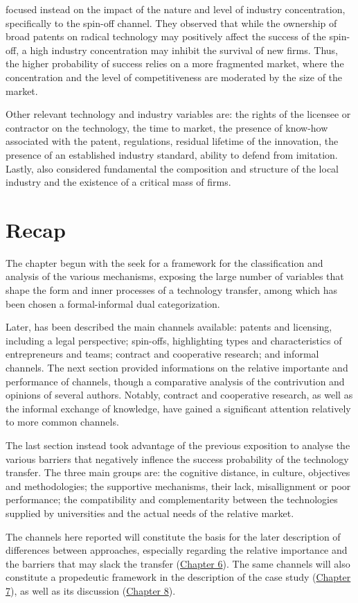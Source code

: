 \citet{Nerkar2003} focused instead on the impact of the nature and level of industry concentration, specifically to the spin-off channel. They observed that while the ownership of broad patents on radical technology may positively affect the success of the spin-off, a high industry concentration may inhibit the survival of new firms. Thus, the higher probability of success relies on a more fragmented market, where the concentration and the level of competitiveness are moderated by the size of the market. 

Other relevant technology and industry variables are: the rights of the licensee or contractor on the technology, the time to market, the presence of know-how associated with the patent, regulations, residual lifetime of the innovation, the presence of an established industry standard, ability to defend from imitation\citep{Balderi2010}. Lastly, \citet{Geuna2009} also considered fundamental the composition and structure of the local industry and the existence of a critical mass of firms.

\section{Recap}

The chapter begun with the seek for a framework for the classification and analysis of the various mechanisms, exposing the large number of variables that shape the form and inner processes of a technology transfer, among which has been chosen a formal-informal dual categorization.

Later, has been described the main channels available: patents and licensing, including a legal perspective; spin-offs, highlighting types and characteristics of entrepreneurs and teams; contract and cooperative research; and informal channels. The next section provided informations on the relative importante and performance of channels, though a comparative analysis of the contrivution and opinions of several authors. Notably, contract and cooperative research, as well as the informal exchange of knowledge, have gained a significant attention relatively to more common channels.

The last section instead took advantage of the previous exposition to analyse the various barriers that negatively inflence the success probability of the technology transfer. The three main groups are: the cognitive distance, in culture, objectives and methodologies; the supportive mechanisms, their lack, misallignment or poor performance; the compatibility and complementarity between the technologies supplied by universities and the actual needs of the relative market.

The channels here reported will constitute the basis for the later description of differences between approaches, especially regarding the relative importance and the barriers that may slack the transfer (\hyperref[Chapter6]{Chapter 6}). The same channels will also constitute a propedeutic framework in the description of the case study (\hyperref[Chapter7]{Chapter 7}), as well as its discussion (\hyperref[Chapter8]{Chapter 8}). 